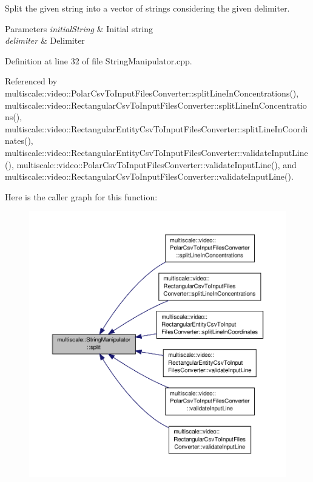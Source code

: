 Split the given string into a vector of strings considering the given delimiter. 


\begin{DoxyParams}{Parameters}
{\em initial\-String} & Initial string \\
\hline
{\em delimiter} & Delimiter \\
\hline
\end{DoxyParams}


Definition at line 32 of file String\-Manipulator.\-cpp.



Referenced by multiscale\-::video\-::\-Polar\-Csv\-To\-Input\-Files\-Converter\-::split\-Line\-In\-Concentrations(), multiscale\-::video\-::\-Rectangular\-Csv\-To\-Input\-Files\-Converter\-::split\-Line\-In\-Concentrations(), multiscale\-::video\-::\-Rectangular\-Entity\-Csv\-To\-Input\-Files\-Converter\-::split\-Line\-In\-Coordinates(), multiscale\-::video\-::\-Rectangular\-Entity\-Csv\-To\-Input\-Files\-Converter\-::validate\-Input\-Line(), multiscale\-::video\-::\-Polar\-Csv\-To\-Input\-Files\-Converter\-::validate\-Input\-Line(), and multiscale\-::video\-::\-Rectangular\-Csv\-To\-Input\-Files\-Converter\-::validate\-Input\-Line().



Here is the caller graph for this function\-:
\nopagebreak
\begin{figure}[H]
\begin{center}
\leavevmode
\includegraphics[width=350pt]{classmultiscale_1_1StringManipulator_a899c72a05bbd8fb525f31bca3c1ec3c4_icgraph}
\end{center}
\end{figure}


